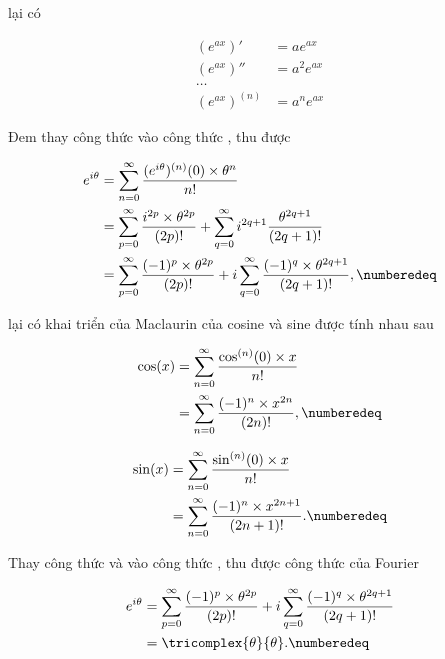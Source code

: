 	\noindent lại có
	
		\begin{equation}
			\begin{aligned}
				(e^{ax})'		& = ae^{ax}\\
				(e^{ax})''		& = a^2e^{ax}\\
				\dots \\
				(e^{ax})^{(n)}	& = a^ne^{ax}
			\end{aligned}
		\label{appendix::fourier_3}
		\end{equation}

	Đem thay công thức  vào công thức , thu được
	
		\begin{align*}
			e^{i\theta}	& = \sum_{n = 0}^{\infty}{\frac{(e^{i\theta})^{(n)}(0) \times \theta^n}{n!}}\\
			& = \sum_{p = 0}^{\infty}{\frac{i^{2p} \times \theta^{2p}}{(2p)!}}
			+ \sum_{q = 0}^{\infty}{i^{2q + 1}\frac{\theta^{2q + 1}}{(2q + 1)!}}	\\
			& = \sum_{p = 0}^{\infty}{\frac{(-1)^p \times \theta^{2p}}{(2p)!}}
			+ i\sum_{q = 0}^{\infty}{\frac{(-1)^{q} \times \theta^{2q + 1}}{(2q + 1)!}}, \numberedeq
			\label{appendix::fourier_4}
		\end{align*}

	\noindent lại có khai triển của Maclaurin của cosine và sine được tính nhau sau
	
		\begin{align*}
			\cos(x)	& = \sum_{n = 0}^{\infty}{\frac{\cos^{(n)}(0) \times x}{n!}}\\
			& = \sum_{n = 0}^{\infty}{\frac{(-1)^n \times x^{2n}}{(2n)!}}, \numberedeq
			\label{appendix::fourier_5}
		\end{align*}
	
		\begin{align*}
			\sin(x)	& = \sum_{n = 0}^{\infty}{\frac{\sin^{(n)}(0) \times x}{n!}}\\
			& = \sum_{n = 0}^{\infty}{\frac{(-1)^n \times x^{2n + 1}}{(2n + 1)!}}. \numberedeq
			\label{appendix::fourier_6}
		\end{align*}

	Thay công thức  và  vào công thức , thu được công thức của Fourier
	
		\begin{align*}
			e^{i\theta} & = \sum_{p = 0}^{\infty}{\frac{(-1)^p \times \theta^{2p}}{(2p)!}}
			+ i\sum_{q = 0}^{\infty}{\frac{(-1)^{q} \times \theta^{2q + 1}}{(2q + 1)!}}\\
			& = \tricomplex{\theta}{\theta}. \numberedeq
			\label{appendix::fourier_final}
		\end{align*}


